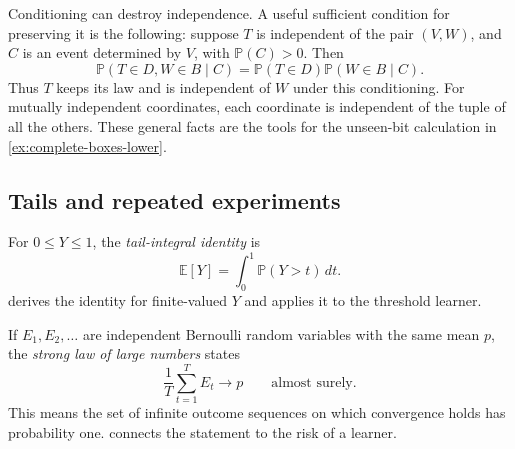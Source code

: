 \documentclass[11pt,twoside]{article}
\renewcommand{\P}{\mathbb P}
\theoremstyle{definition}
\theoremstyle{remark}
\begin{document}
Conditioning can destroy independence. A useful sufficient condition for
preserving it is the following: suppose $T$ is independent of the pair
$(V,W)$, and $C$ is an event determined by $V$, with $\P(C)>0$. Then
\begin{equation}
\P(T\in D,W\in B\mid C)
=\P(T\in D)\P(W\in B\mid C).
\label{eq:conditional-block-independence}
\end{equation}
Thus $T$ keeps its law and is independent of $W$ under this conditioning.
For mutually independent coordinates, each coordinate is independent of the
tuple of all the others. These general facts are the tools for the unseen-bit
calculation in \cref{ex:complete-boxes-lower}.

\subsection{Tails and repeated experiments}
\label{sec:tails-and-repetitions}
For $0\le Y\le1$, the \emph{tail-integral identity} is
\begin{equation}
\mathbb E[Y]=\int_0^1\P(Y>t)\,dt.
\label{eq:tail-integral}
\end{equation}
 derives the identity for finite-valued $Y$
and applies it to the threshold learner.

If $E_1,E_2,\ldots$ are independent Bernoulli random variables with the same
mean $p$, the \emph{strong law of large numbers} states
\[
\frac1T\sum_{t=1}^T E_t\longrightarrow p
\qquad\text{almost surely}.
\]
This means the set of infinite outcome sequences on which convergence holds
has probability one.  connects the statement
to the risk of a learner.

\clearpage
\end{document}
